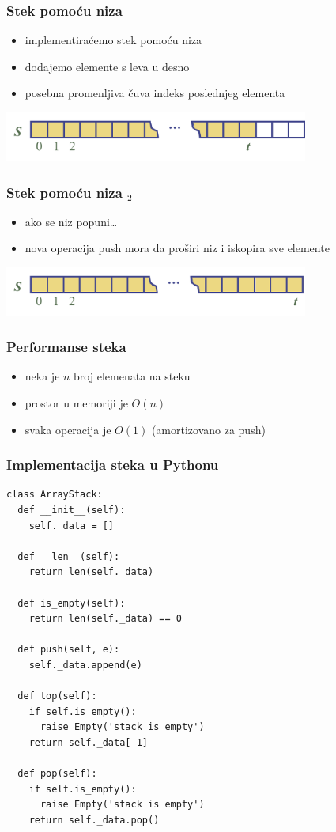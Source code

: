 \documentclass[compress]{beamer}
\begin{document}
\begin{frame}[fragile]
  \frametitle{Stek pomoću niza}
  \begin{itemize}
    \item implementiraćemo stek pomoću niza
    \item dodajemo elemente s leva u desno
    \item posebna promenljiva čuva indeks poslednjeg elementa
  \end{itemize}
  \begin{center}
    \includegraphics[width=10cm]{asp-05-pic02.png}
  \end{center}
\end{frame}

\begin{frame}[fragile]
  \frametitle{Stek pomoću niza $_2$}
  \begin{itemize}
    \item ako se niz popuni\ldots
    \item nova operacija push mora da proširi niz i iskopira sve elemente
  \end{itemize}
  \begin{center}
    \includegraphics[width=10cm]{asp-05-pic03.png}
  \end{center}
\end{frame}

\begin{frame}[fragile]
  \frametitle{Performanse steka}
  \begin{itemize}
    \item neka je $n$ broj elemenata na steku
    \item prostor u memoriji je $O(n)$
    \item svaka operacija je $O(1)$ (amortizovano za push)
  \end{itemize}
\end{frame}

\begin{frame}[fragile,shrink=10]
  \frametitle{Implementacija steka u Pythonu}
\begin{verbatim}
class ArrayStack:
  def __init__(self):
    self._data = []
  
  def __len__(self):
    return len(self._data)
    
  def is_empty(self):
    return len(self._data) == 0
  
  def push(self, e):
    self._data.append(e)
    
  def top(self):
    if self.is_empty():
      raise Empty('stack is empty')
    return self._data[-1]
    
  def pop(self):
    if self.is_empty():
      raise Empty('stack is empty')
    return self._data.pop()
\end{verbatim}
\end{frame}
\end{document}

